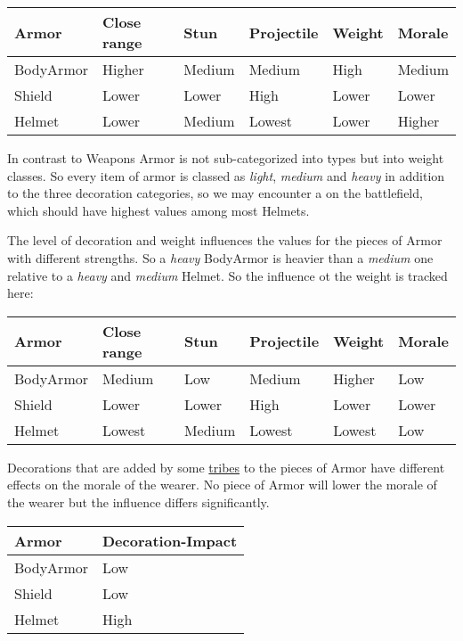 \begin{longtable}{llllll}
	\toprule
	\Gls*{Armor}
	 & Close range & Stun   & Projectile & Weight & Morale \\
	\midrule
	\Gls{BodyArmor}
	 & Higher      & Medium & Medium     & High   & Medium \\
	\Gls{Shield}
	 & Lower       & Lower  & High       & Lower  & Lower  \\
	\Gls{Helmet}
	 & Lower       & Medium & Lowest     & Lower  & Higher \\
	\bottomrule
\end{longtable}

In contrast to \glspl{Weapon} \gls*{Armor} is not sub-categorized into types
but into weight classes. So every item of armor is classed as \emph{light},
\emph{medium} and \emph{heavy} in addition to the three decoration categories,
so we may encounter a  on the
battlefield, which should have highest values among most \glspl{Helmet}.

The level of decoration and weight influences the values for the pieces of
\gls{Armor} with different strengths. So a \emph{heavy} \gls{BodyArmor} is
heavier than a \emph{medium} one relative to a \emph{heavy} and \emph{medium}
\gls{Helmet}. So the influence ot the weight is tracked here:

\begin{longtable}{llllll}
	\toprule
	\Gls*{Armor}
	 & Close range & Stun   & Projectile & Weight & Morale \\
	\midrule
	\Gls{BodyArmor}
	 & Medium      & Low    & Medium     & Higher & Low    \\
	\Gls{Shield}
	 & Lower       & Lower  & High       & Lower  & Lower  \\
	\Gls{Helmet}
	 & Lowest      & Medium & Lowest     & Lowest & Low    \\
	\bottomrule
\end{longtable}

Decorations that are added by some \hyperref[ch:Tribes]{tribes} to the pieces
of \gls*{Armor} have different effects on the morale of the wearer. No piece of
\gls*{Armor} will lower the morale of the wearer but the influence differs
significantly.

\begin{longtable}{ll}
	\toprule
	\Gls*{Armor}    & Decoration-Impact \\
	\midrule
	\Gls{BodyArmor} & Low               \\
	\Gls{Shield}    & Low               \\
	\Gls{Helmet}    & High              \\
	\bottomrule
\end{longtable}

